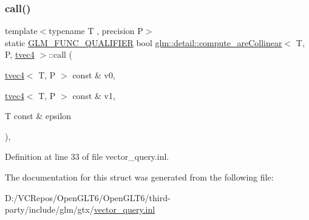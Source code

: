 \subsubsection{\texorpdfstring{call()}{call()}}
{\footnotesize\ttfamily template$<$typename T , precision P$>$ \\
static \mbox{\hyperlink{setup_8hpp_a33fdea6f91c5f834105f7415e2a64407}{G\+L\+M\+\_\+\+F\+U\+N\+C\+\_\+\+Q\+U\+A\+L\+I\+F\+I\+ER}} bool \mbox{\hyperlink{structglm_1_1detail_1_1compute__are_collinear}{glm\+::detail\+::compute\+\_\+are\+Collinear}}$<$ T, P, \mbox{\hyperlink{structglm_1_1tvec4}{tvec4}} $>$\+::call (\begin{DoxyParamCaption}\item[{\mbox{\hyperlink{structglm_1_1tvec4}{tvec4}}$<$ T, P $>$ const \&}]{v0,  }\item[{\mbox{\hyperlink{structglm_1_1tvec4}{tvec4}}$<$ T, P $>$ const \&}]{v1,  }\item[{T const \&}]{epsilon }\end{DoxyParamCaption})\hspace{0.3cm}{\ttfamily [inline]}, {\ttfamily [static]}}



Definition at line 33 of file vector\+\_\+query.\+inl.



The documentation for this struct was generated from the following file\+:\begin{DoxyCompactItemize}
\item 
D\+:/\+V\+C\+Repos/\+Open\+G\+L\+T6/\+Open\+G\+L\+T6/third-\/party/include/glm/gtx/\mbox{\hyperlink{vector__query_8inl}{vector\+\_\+query.\+inl}}\end{DoxyCompactItemize}
